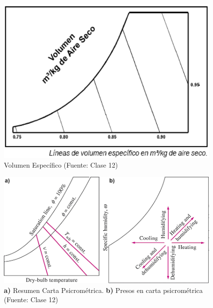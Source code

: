         \begin{multicols}{2}
            \begin{quote}
            \end{quote}
            
            \begin{figure}
                \includegraphics[width=\textwidth]{img/clases/vol_especifico_psicrometrico.png}
                \caption{Volumen Específico (Fuente: Clase 12)}
                \label{fig:vol_especifico_psicrometrico}
            \end{figure}
        \end{multicols}
        
         \begin{figure}
            \includegraphics[width=.75\textwidth]{img/clases/resumen_psicrometria_edit.png}
            \caption[Resumen Carta Psicrométrica]{\textbf{a)} Resumen Carta Psicrométrica. \textbf{b)} Presos en carta psicrométrica (Fuente: Clase 12)}
            \label{fig:resumen_psicrometrica}
        \end{figure}
    
